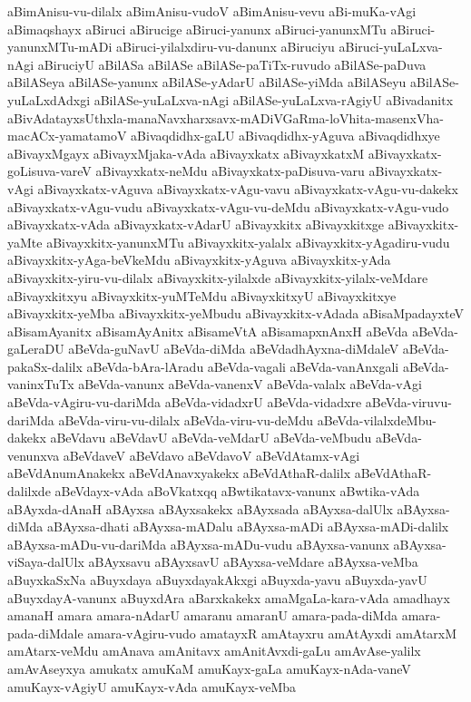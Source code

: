 {aBimAnisu-vu-dilalx
aBimAnisu-vudoV
aBimAnisu-vevu
aBi-muKa-vAgi
aBimaqshayx
aBiruci
aBirucige
aBiruci-yanunx
aBiruci-yanunxMTu
aBiruci-yanunxMTu-mADi
aBiruci-yilalxdiru-vu-danunx
aBiruciyu
aBiruci-yuLaLxva-nAgi
aBiruciyU
aBilASa
aBilASe
aBilASe-paTiTx-ruvudo
aBilASe-paDuva
aBilASeya
aBilASe-yanunx
aBilASe-yAdarU
aBilASe-yiMda
aBilASeyu
aBilASe-yuLaLxdAdxgi
aBilASe-yuLaLxva-nAgi
aBilASe-yuLaLxva-rAgiyU
aBivadanitx
aBivAdatayxsUthxla-manaNavxharxsavx-mADiVGaRma-loVhita-masenxVha-macACx-yamatamoV
aBivaqdidhx-gaLU
aBivaqdidhx-yAguva
aBivaqdidhxye
aBivayxMgayx
aBivayxMjaka-vAda
aBivayxkatx
aBivayxkatxM
aBivayxkatx-goLisuva-vareV
aBivayxkatx-neMdu
aBivayxkatx-paDisuva-varu
aBivayxkatx-vAgi
aBivayxkatx-vAguva
aBivayxkatx-vAgu-vavu
aBivayxkatx-vAgu-vu-dakekx
aBivayxkatx-vAgu-vudu
aBivayxkatx-vAgu-vu-deMdu
aBivayxkatx-vAgu-vudo
aBivayxkatx-vAda
aBivayxkatx-vAdarU
aBivayxkitx
aBivayxkitxge
aBivayxkitx-yaMte
aBivayxkitx-yanunxMTu
aBivayxkitx-yalalx
aBivayxkitx-yAgadiru-vudu
aBivayxkitx-yAga-beVkeMdu
aBivayxkitx-yAguva
aBivayxkitx-yAda
aBivayxkitx-yiru-vu-dilalx
aBivayxkitx-yilalxde
aBivayxkitx-yilalx-veMdare
aBivayxkitxyu
aBivayxkitx-yuMTeMdu
aBivayxkitxyU
aBivayxkitxye
aBivayxkitx-yeMba
aBivayxkitx-yeMbudu
aBivayxkitx-vAdada
aBisaMpadayxteV
aBisamAyanitx
aBisamAyAnitx
aBisameVtA
aBisamapxnAnxH
aBeVda
aBeVda-gaLeraDU
aBeVda-guNavU
aBeVda-diMda
aBeVdadhAyxna-diMdaleV
aBeVda-pakaSx-dalilx
aBeVda-bAra-lAradu
aBeVda-vagali
aBeVda-vanAnxgali
aBeVda-vaninxTuTx
aBeVda-vanunx
aBeVda-vanenxV
aBeVda-valalx
aBeVda-vAgi
aBeVda-vAgiru-vu-dariMda
aBeVda-vidadxrU
aBeVda-vidadxre
aBeVda-viruvu-dariMda
aBeVda-viru-vu-dilalx
aBeVda-viru-vu-deMdu
aBeVda-vilalxdeMbu-dakekx
aBeVdavu
aBeVdavU
aBeVda-veMdarU
aBeVda-veMbudu
aBeVda-venunxva
aBeVdaveV
aBeVdavo
aBeVdavoV
aBeVdAtamx-vAgi
aBeVdAnumAnakekx
aBeVdAnavxyakekx
aBeVdAthaR-dalilx
aBeVdAthaR-dalilxde
aBeVdayx-vAda
aBoVkatxqq
aBwtikatavx-vanunx
aBwtika-vAda
aBAyxda-dAnaH
aBAyxsa
aBAyxsakekx
aBAyxsada
aBAyxsa-dalUlx
aBAyxsa-diMda
aBAyxsa-dhati
aBAyxsa-mADalu
aBAyxsa-mADi
aBAyxsa-mADi-dalilx
aBAyxsa-mADu-vu-dariMda
aBAyxsa-mADu-vudu
aBAyxsa-vanunx
aBAyxsa-viSaya-dalUlx
aBAyxsavu
aBAyxsavU
aBAyxsa-veMdare
aBAyxsa-veMba
aBuyxkaSxNa
aBuyxdaya
aBuyxdayakAkxgi
aBuyxda-yavu
aBuyxda-yavU
aBuyxdayA-vanunx
aBuyxdAra
aBarxkakekx
amaMgaLa-kara-vAda
amadhayx
amanaH
amara
amara-nAdarU
amaranu
amaranU
amara-pada-diMda
amara-pada-diMdale
amara-vAgiru-vudo
amatayxR
amAtayxru
amAtAyxdi
amAtarxM
amAtarx-veMdu
amAnava
amAnitavx
amAnitAvxdi-gaLu
amAvAse-yalilx
amAvAseyxya
amukatx
amuKaM
amuKayx-gaLa
amuKayx-nAda-vaneV
amuKayx-vAgiyU
amuKayx-vAda
amuKayx-veMba
}
